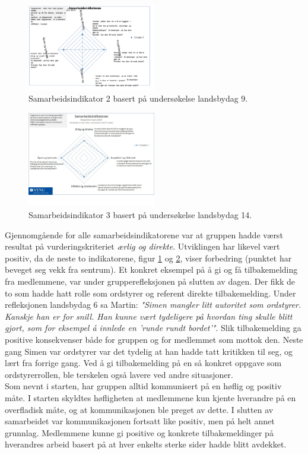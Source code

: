 \begin{figure}[h!]
\centering
    \includegraphics[width=0.5\textwidth]{Bilder/samarbeidsindikator_2.png}
 \caption{Samarbeidsindikator 2 basert på undersøkelse landsbydag 9.}
    \label{samind2}
\end{figure}

\begin{figure}[h!]
  \centering
    \includegraphics[width=0.5\textwidth]{Bilder/samarbeidsindikator_3.jpg}
    \caption{Samarbeidsindikator 3 basert på undersøkelse landsbydag 14.}
    \label{samind3}
\end{figure}

Gjennomgående for alle samarbeidsindikatorene var at gruppen hadde værst resultat på vurderingskriteriet \textit{ærlig og direkte}. 
Utviklingen har likevel vært positiv, da de neste to indikatorene, figur \ref{samind2} og \ref{samind3}, viser forbedring (punktet har beveget seg vekk fra sentrum). 
Et konkret eksempel på å gi og få tilbakemelding fra medlemmene, var under grupperefleksjonen på slutten av dagen. Der fikk de to som hadde hatt rolle som ordstyrer og referent direkte tilbakemelding.
Under refleksjonen landsbydag 6 sa Martin: \textit{"Simen mangler litt autoritet som ordstyrer. Kanskje han er for snill. Han kunne vært tydeligere på hvordan ting skulle blitt gjort, som for eksempel å innlede en 'runde rundt bordet'"}.
Slik tilbakemelding ga positive konsekvenser både for gruppen og for medlemmet som mottok den.
Neste gang Simen var ordstyrer var det tydelig at han hadde tatt kritikken til seg, og lært fra forrige gang.
Ved å gi tilbakemelding på en så konkret oppgave som ordstyrerrollen, ble terskelen også lavere ved andre situasjoner. \\

Som nevnt i starten, har gruppen alltid kommunisert på en høflig og positiv måte.
I starten skyldtes høfligheten at medlemmene kun kjente hverandre på en overfladisk måte, og at kommunikasjonen ble preget av dette.
I slutten av samarbeidet var kommunikasjonen fortsatt like positiv, men på helt annet grunnlag.
Medlemmene kunne gi positive og konkrete tilbakemeldinger på hverandres arbeid basert på at hver enkelts sterke sider hadde blitt avdekket.